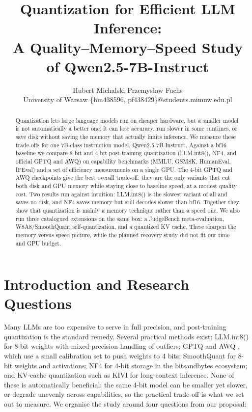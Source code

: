 \documentclass[11pt,a4paper]{article}
\title{\textbf{Quantization for Efficient LLM Inference:\\
A Quality--Memory--Speed Study of Qwen2.5-7B-Instruct}}
\author{Hubert Michalski \quad Przemys{\l}aw Fuchs\\[2pt]
\small University of Warsaw \quad \{hm438596, pf438429\}@students.mimuw.edu.pl}
\date{}
\begin{document}
\maketitle

\begin{abstract}
\noindent
Quantization lets large language models run on cheaper hardware, but a smaller
model is not automatically a better one: it can lose accuracy, run slower in some
runtimes, or save disk without saving the memory that actually limits inference.
We measure these trade-offs for one 7B-class instruction model,
Qwen2.5-7B-Instruct. Against a bf16 baseline we compare 8-bit and 4-bit
post-training quantization (LLM.int8(), NF4, and official GPTQ and AWQ) on
capability benchmarks (MMLU, GSM8K, HumanEval, IFEval) and a set of efficiency
measurements on a single GPU. The 4-bit GPTQ and AWQ checkpoints give the best
overall trade-off: they are the only variants that cut both disk and GPU memory
while staying close to baseline speed, at a modest quality cost. Two results run
against intuition: LLM.int8() is the slowest variant of all and saves no disk, and
NF4 saves memory but still decodes slower than bf16. Together they show that
quantization is mainly a memory technique rather than a speed one. We also run
three catalogued extensions on the same box: a JudgeBench meta-evaluation,
W8A8/SmoothQuant self-quantization, and a quantized KV cache. These sharpen the
memory-versus-speed picture, while the planned recovery study did not fit our
time and GPU budget.
\end{abstract}

\section{Introduction and Research Questions}

Many LLMs are too expensive to serve in full precision, and post-training
quantization is the standard remedy. Several practical methods exist: LLM.int8()
\citep{llmint8} for 8-bit weights with mixed-precision handling of outliers; GPTQ
\citep{gptq} and AWQ \citep{awq}, which use a small calibration set to push weights
to 4 bits; SmoothQuant \citep{smoothquant} for 8-bit weights and activations; NF4
for 4-bit storage in the bitsandbytes ecosystem; and KV-cache quantization such
as KIVI \citep{kivi} for long-context
inference. None of these is automatically beneficial: the same 4-bit model can
be smaller yet slower, or degrade unevenly across capabilities, so the
practical trade-off is what we set out to measure. We organise the study around
four questions from our proposal:
\end{document}
